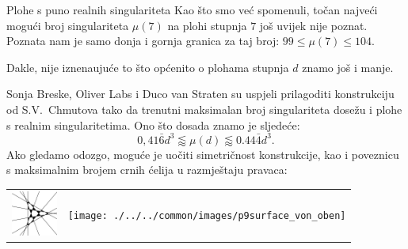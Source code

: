 \begin{surferPage}[216 Singularities]{Plohe s puno realnih singulariteta}
		Kao \v sto smo ve\' c spomenuli, to\v can najve\' ci mogu\' ci broj singulariteta $\mu(7)$ 
		na plohi stupnja $7$ jo\v s uvijek nije poznat. Poznata nam je samo donja i 
		gornja granica za taj broj: $99\le \mu(7) \le 104$.
		
		
		Dakle, nije iznena\dj uju\' ce to \v sto op\' cenito o plohama stupnja $d$ znamo jo\v s i manje.
		
		Sonja Breske, Oliver Labs i Duco van Straten su uspjeli prilagoditi 
		konstrukciju od S.V.\ Chmutova tako da trenutni maksimalan broj singulariteta 
		dose\v zu i plohe s realnim singularitetima.
		Ono \v sto dosada znamo je sljede\' ce:
		\[0,41\bar{6}d^3 \lessapprox \mu(d) \lessapprox 0.44\bar{4} d^3.\]
		Ako gledamo odozgo, mogu\' ce je uo\v citi simetri\v cnost konstrukcije, kao i 
		poveznicu s maksimalnim brojem crnih \' celija u razmje\v staju pravaca:
		\begin{center}
      \begin{tabular}{c@{\qquad}c}
        \includegraphics[height=1.5cm]{./../../common/images/vielesing.pdf}
        &
        \texttt{[image: ./../../common/images/p9surface\_von\_oben]}
      \end{tabular}
    \end{center}
\end{surferPage}
